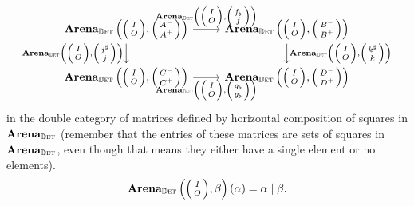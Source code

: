 \documentclass[DynamicalBook]{subfiles}
\begin{document}
\begin{proposition}
\begin{itemize}
\[\begin{tikzcd}
        \Cat{Arena}_{\determ}\left(\littlelens{I}{O}, \littlelens{A^-}{A^+} \right) \ar[r, "{\Cat{Arena}_{\determ}\left(\littlelens{I}{O}, \littlelens{f_{\flat}}{f} \right)}"]  \ar[d, "{\Cat{Arena}_{\determ}\left(\littlelens{I}{O}, \littlelens{j^{\sharp}}{j} \right)}"'] 
         &  \Cat{Arena}_{\determ}\left(\littlelens{I}{O}, \littlelens{B^-}{B^+} \right)\ar[d,
        "{ \Cat{Arena}_{\determ}\left(\littlelens{I}{O}, \littlelens{k^{\sharp}}{k} \right) }"] \\
   \Cat{Arena}_{\determ}\left(\littlelens{I}{O}, \littlelens{C^-}{C^+} \right)      \ar[r, "{\Cat{Arena}_{\determ}\left(\littlelens{I}{O}, \littlelens{g_{\flat}}{g_{\flat}} \right)}"']  & \Cat{Arena}_{\determ}\left(\littlelens{I}{O}, \littlelens{D^-}{D^+} \right)
      \end{tikzcd}
    \]
    in the double category of matrices defined by horizontal composition of
    squares in $\textbf{Arena}_{\mathbb{D}\textsc{et}}$ (remember that the entries of these matrices are
    sets of squares in $\textbf{Arena}_{\mathbb{D}\textsc{et}}$, even though that means they either have a
    single element or no elements).
    \begin{align*}
    \Cat{Arena}_{\determ}\left(\littlelens{I}{O}, \beta \right)(\alpha) = \alpha \mid \beta.
\end{align*}
\end{itemize}
\end{proposition}
\end{document}
